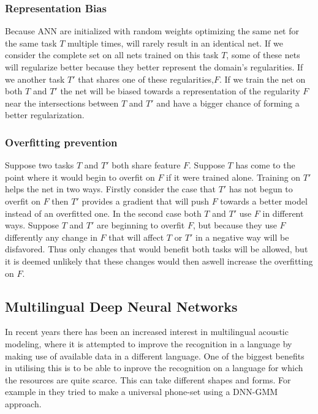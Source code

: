 \documentclass[a4paper]{article}
\begin{document}
\subsubsection{Representation Bias}
Because ANN are initialized with random weights optimizing the same net for the same task $T$ multiple times, will rarely result in an identical net. If we consider the complete set on all nets trained on this task $T$, some of these nets will regularize better because they better represent the domain's regularities. If we another task $T'$ that shares one of these regularities,$F$. If we train the net on both $T$ and $T'$ the net will be biased towards a representation of the regularity $F$ near the intersections between $T$ and $T'$ and have a bigger chance of forming a better regularization.
\subsubsection{Overfitting prevention}
Suppose two tasks $T$ and $T'$ both share feature $F$. Suppose $T$ has come to the point where it would begin to overfit on $F$ if it were trained alone. Training on $T'$ helps the net in two ways.
Firstly consider the case that $T'$ has not begun to overfit on $F$ then $T'$ provides a gradient that will push $F$ towards a better model instead of an overfitted one.
In the second case both $T$ and $T'$ use $F$ in different ways. Suppose $T$ and $T'$ are beginning to overfit $F$, but because they  use $F$ differently any change in $F$ that will affect $T$ or $T'$ in a negative way will be disfavored. Thus only changes that would benefit both tasks will be allowed, but it is deemed unlikely that these changes would then aswell increase the overfitting on $F$.





\subsection{Multilingual Deep Neural Networks}
In recent years there has been an increased interest in multilingual acoustic modeling, where it is attempted to improve the recognition in a language by making use of available data in a different language. One of the biggest benefits in utilising this is to be able to inprove the recognition on a language for which the resources are quite scarce.  This can take different shapes and forms. For example in \cite{multi2} they tried to make a universal phone-set using a DNN-GMM approach.
\end{document}

